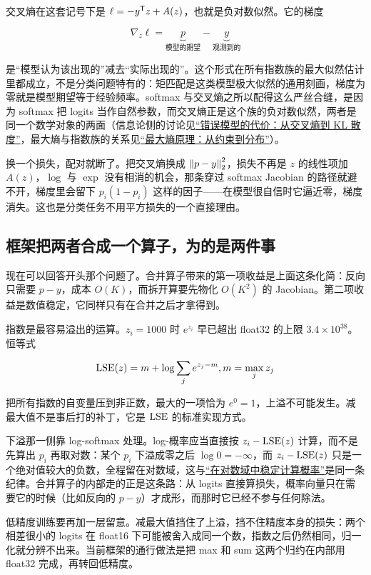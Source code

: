 交叉熵在这套记号下是 \(\ell=-y^{\mathsf{T}}z+A(z)\)，也就是负对数似然。它的梯度

\[
\nabla_z\ell=\underbrace{p}_{\text{模型的期望}}-\underbrace{y}_{\text{观测到的}}
\]

是``模型认为该出现的''减去``实际出现的''。这个形式在所有指数族的最大似然估计里都成立，不是分类问题特有的：矩匹配是这类模型极大似然的通用刻画，梯度为零就是模型期望等于经验频率。softmax 与交叉熵之所以配得这么严丝合缝，是因为 softmax 把 logits 当作自然参数，而交叉熵正是这个族的负对数似然，两者是同一个数学对象的两面（信息论侧的讨论见\hyperref[sec:07-Information-Theory/03-Divergences/01]{``错误模型的代价：从交叉熵到 KL 散度''}，最大熵与指数族的关系见\hyperref[sec:07-Information-Theory/01-Information-and-Entropy/04]{``最大熵原理：从约束到分布''}）。

换一个损失，配对就断了。把交叉熵换成 \(\left\lVert p-y\right\rVert_2^2\)，损失不再是 \(z\) 的线性项加 \(A(z)\)，\(\log\) 与 \(\exp\) 没有相消的机会，那条穿过 softmax Jacobian 的路径就避不开，梯度里会留下 \(p_i(1-p_i)\) 这样的因子——在模型很自信时它逼近零，梯度消失。这也是分类任务不用平方损失的一个直接理由。

\subsection{框架把两者合成一个算子，为的是两件事}

现在可以回答开头那个问题了。合并算子带来的第一项收益是上面这条化简：反向只需要 \(p-y\)，成本 \(O(K)\)，而拆开算要先物化 \(O(K^2)\) 的 Jacobian。第二项收益是数值稳定，它同样只有在合并之后才拿得到。

指数是最容易溢出的运算。\(z_i=1000\) 时 \(e^{z_i}\) 早已超出 float32 的上限 \(3.4\times10^{38}\)。恒等式

\[
\operatorname{LSE}(z)=m+\log\sum_je^{z_j-m},\space m=\max_jz_j
\]

把所有指数的自变量压到非正数，最大的一项恰为 \(e^0=1\)，上溢不可能发生。减最大值不是事后打的补丁，它是 \(\operatorname{LSE}\) 的标准实现方式。

下溢那一侧靠 log-softmax 处理。log-概率应当直接按 \(z_i-\operatorname{LSE}(z)\) 计算，而不是先算出 \(p_i\) 再取对数：某个 \(p_i\) 下溢成零之后 \(\log0=-\infty\)，而 \(z_i-\operatorname{LSE}(z)\) 只是一个绝对值较大的负数，全程留在对数域，这与\hyperref[sec:08-Numerical-Analysis/07-Numerical-Methods-for-ML/01]{``在对数域中稳定计算概率''}是同一条纪律。合并算子的内部走的正是这条路：从 logits 直接算损失，概率向量只在需要它的时候（比如反向的 \(p-y\)）才成形，而那时它已经不参与任何除法。

低精度训练要再加一层留意。减最大值挡住了上溢，挡不住精度本身的损失：两个相差很小的 logits 在 float16 下可能被舍入成同一个数，指数之后仍然相同，归一化就分辨不出来。当前框架的通行做法是把 max 和 sum 这两个归约在内部用 float32 完成，再转回低精度。

